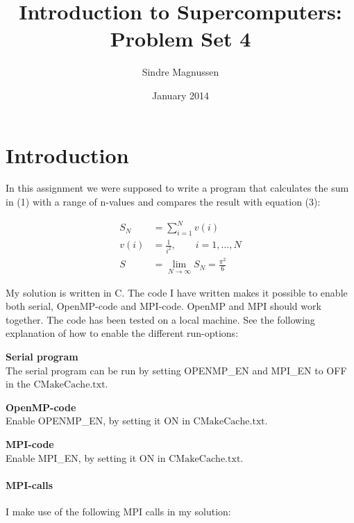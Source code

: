 \documentclass{article}
\title{Introduction to Supercomputers: Problem Set 4}
\author{Sindre Magnussen}
\date{January 2014}
\begin{document}
\maketitle

\section*{Introduction}
	In this assignment we were supposed to write a program that calculates the sum in (1) with a range of n-values and compares the result with equation (3):
	
	\begin{align}
	S_N &= \sum_{i = 1}^{N} v(i) \\
	v(i) &= \frac{1}{i^2},\qquad i = 1,\ldots,N \\
	S &= \lim_{N\to\infty} S_N = \frac{\pi^2}{6}
	\end{align}
	
	My solution is written in C. The code I have written makes it possible to enable both serial, OpenMP-code and MPI-code. OpenMP and MPI should work together. The code has been tested on a local machine. See the following explanation of how to enable the different run-options: 

\begin{list}{}{}
\item \textbf{Serial program} \\
	The serial program can be run by setting OPENMP\_EN and MPI\_EN to OFF in the $\mathrm{CMakeCache.txt}$.
	
\item \textbf{OpenMP-code} \\
	Enable OPENMP\_EN, by setting it ON in $\mathrm{CMakeCache.txt}$. 
	
\item \textbf{MPI-code} \\
	Enable MPI\_EN, by setting it ON in $\mathrm{CMakeCache.txt}$. 
\end{list}

\newpage

\paragraph*{MPI-calls}
I make use of the following MPI calls in my solution:

\end{document}
